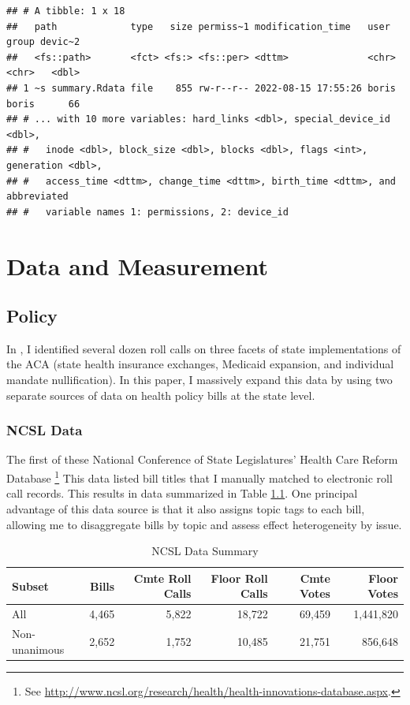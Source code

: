 \documentclass[
  oneside]{book}
\begin{document}
\begin{verbatim}
## # A tibble: 1 x 18
##   path             type   size permiss~1 modification_time   user  group devic~2
##   <fs::path>       <fct> <fs:> <fs::per> <dttm>              <chr> <chr>   <dbl>
## 1 ~s summary.Rdata file    855 rw-r--r-- 2022-08-15 17:55:26 boris boris      66
## # ... with 10 more variables: hard_links <dbl>, special_device_id <dbl>,
## #   inode <dbl>, block_size <dbl>, blocks <dbl>, flags <int>, generation <dbl>,
## #   access_time <dttm>, change_time <dttm>, birth_time <dttm>, and abbreviated
## #   variable names 1: permissions, 2: device_id
\end{verbatim}

\hypertarget{data-and-measurement}{%
\chapter{Data and Measurement}\label{data-and-measurement}}

\hypertarget{policy}{%
\section{Policy}\label{policy}}

In \citet{Shor:2018}, I identified several dozen roll calls on three facets of state implementations of the ACA (state health insurance exchanges, Medicaid expansion, and individual mandate nullification). In this paper, I massively expand this data by using two separate sources of data on health policy bills at the state level.

\hypertarget{ncsl-data}{%
\subsection{NCSL Data}\label{ncsl-data}}

The first of these National Conference of State Legislatures' Health Care Reform Database \footnote{See \url{http://www.ncsl.org/research/health/health-innovations-database.aspx}.} This data listed bill titles that I manually matched to electronic roll call records. This results in data summarized in Table \ref{tab:ncsl-summary}. One principal advantage of this data source is that it also assigns topic tags to each bill, allowing me to disaggregate bills by topic and assess effect heterogeneity by issue.

\begin{table}

\caption{\label{tab:ncsl-summary}NCSL Data Summary}
\centering
\begin{tabular}[t]{lrrrrr}
\toprule
Subset & Bills & Cmte Roll Calls & Floor Roll Calls & Cmte Votes & Floor Votes\\
\midrule
All & 4,465 & 5,822 & 18,722 & 69,459 & 1,441,820\\
Non-unanimous & 2,652 & 1,752 & 10,485 & 21,751 & 856,648\\
\bottomrule
\end{tabular}
\end{table}
\end{document}
